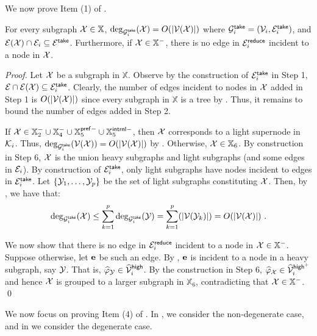 We now prove Item (1) of .

\begin{lemma}\label{lm:Item1Clustering}For every subgraph $\mathcal{X} \in \mathbb{X}$,  $\deg_{\mathcal{G}^{\mathsf{take}}_i}(\mathcal{X}) = O(|\mathcal{V}(\mathcal{X})|)$ where $\mathcal{G}^{\mathsf{take}}_i = (\mathcal{V}_i,\mathcal{E}_i^{\mathsf{take}})$, and $\mathcal{E}(\mathcal{X})\cap \mathcal{E}_i \subseteq \mathcal{E}^{\mathsf{take}}$.  Furthermore, if $\mathcal{X} \in \mathbb{X}^{-}$, there is no edge in $\mathcal{E}_i^{\mathsf{reduce}}$ incident to a node in $\mathcal{X}$.
\end{lemma}
\begin{proof} Let $\mathcal{X}$ be a subgraph in $\mathbb{X}$. Observe by the construction of $\mathcal{E}^{\mathsf{take}}_i$ in Step 1, $\mathcal{E}\cap \mathcal{E}(\mathcal{X})\subseteq \mathcal{E}^{\mathsf{take}}_i$.  Clearly, the number of edges incident to nodes in $\mathcal{X}$ added in Step 1 is $O(|\mathcal{V}(\mathcal{X})|)$ since  every subgraph in $\mathbb{X}$ is a tree by .  Thus, it remains to bound the number of edges added in Step 2.	
	
	If $\mathcal{X} \in \mathbb{X}^{-}_2\cup \mathbb{X}^{-}_4 \cup \mathbb{X}^{\mathsf{pref}-}_5\cup \mathbb{X}^{\mathsf{intrnl}-}_5$, then $\mathcal{X}$ corresponds to a light supernode in $\mathcal{K}_i$. Thus, $\deg_{\mathcal{G}^{\mathsf{take}}_i}(\mathcal{V}(\mathcal{X})) = O(|\mathcal{V}(\mathcal{X})|)$  by . Otherwise, $\mathcal{X} \in \mathbb{X}_6$. By construction in Step 6, $\mathcal{X}$ is the union  heavy subgraphs and light subgraphs  (and some edges in $\mathcal{E}_i$). By construction of $\mathcal{E}_i^{\mathsf{take}}$, only light subgraphs have nodes incident to edges in $\mathcal{E}_i^{\mathsf{take}}$. Let $\{\mathcal{Y}_1,\ldots, \mathcal{Y}_p\}$ be the set of light subgraphs constituting $\mathcal{X}$. Then, by , we have that:
	\begin{equation*}
		\deg_{\mathcal{G}^{\mathsf{take}}_i}(\mathcal{X})  \leq \sum_{k=1}^{p}\deg_{\mathcal{G}^{\mathsf{take}}_i}(\mathcal{Y}) =  \sum_{k=1}^{p} (|\mathcal{V}(\mathcal{Y}_k)|) = O(|\mathcal{V}(\mathcal{X})|)~.
	\end{equation*}

We now show that there is no edge in $\mathcal{E}_i^{\mathsf{reduce}}$ incident to a node in $\mathcal{X} \in \mathbb{X}^-$. Suppose otherwise, let $\mathbf{e}$ be such an edge.  
By , $\mathbf{e}$ is incident to a node in a heavy subgraph, say $\mathcal{Y}$. That is, $\widehat{\varphi}_{\mathcal{Y}}\in \widehat{\mathcal{V}}^{\mathsf{high}}_i$.  By the construction in Step 6, $\widehat{\varphi}_{\mathcal{X}} \in \widehat{\mathcal{V}}^{\mathsf{high}^+}_i$ and hence $\mathcal{X}$ is grouped to a larger subgraph in $\mathbb{X}_6$, contradicting that  $\mathcal{X} \in \mathbb{X}^-$. 
 \qed
\end{proof}


We now focus on proving Item (4) of . In , we consider the non-degenerate case, and in  we consider the degenerate case. 

